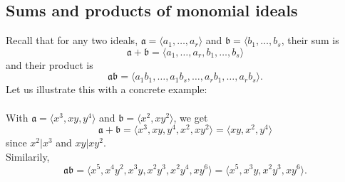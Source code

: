 \documentclass[english,bachelor]{liumaiex}
\begin{document}
\subsection{Sums and products of monomial ideals}
Recall that for any two ideals, $\mathfrak{a}=\langle a_1,\dots,a_r\rangle$ and $\mathfrak{b} = \langle b_1,\dots,b_s$, their sum is
\begin{displaymath}
\mathfrak{a}+\mathfrak{b}=\langle a_1,\dots,a_r,b_1,\dots,b_s\rangle
\end{displaymath}
and their product is
\begin{displaymath}
\mathfrak{a}\mathfrak{b}=\langle a_1b_1,\dots,a_1b_s,\dots,a_rb_1,\dots,a_rb_s\rangle.
\end{displaymath}
Let us illustrate this with a concrete example:\\ \\
With $\mathfrak{a}=\langle x^3,xy,y^4\rangle$ and $\mathfrak{b}=\langle x^2,xy^2\rangle$, we get
\begin{displaymath}
\mathfrak{a}+\mathfrak{b}=\langle x^3,xy,y^4,x^2,xy^2\rangle = \langle xy,x^2,y^4\rangle
\end{displaymath}
since $x^2\vert x^3$ and $xy \vert xy^2$.\\
Similarily,
\begin{displaymath}
\mathfrak{a}\mathfrak{b}=\langle x^5,x^4y^2,x^3y,x^2y^3,x^2y^4,xy^6\rangle = \langle x^5,x^3y,x^2y^3,xy^6\rangle.
\end{displaymath}
\end{document}
